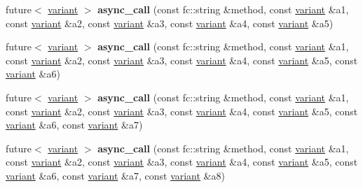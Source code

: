 \begin{Indent}
\begin{DoxyCompactItemize}
future$<$ \mbox{\hyperlink{classfc_1_1variant}{variant}} $>$ {\bfseries async\+\_\+call} (const fc\+::string \&method, const \mbox{\hyperlink{classfc_1_1variant}{variant}} \&a1, const \mbox{\hyperlink{classfc_1_1variant}{variant}} \&a2, const \mbox{\hyperlink{classfc_1_1variant}{variant}} \&a3, const \mbox{\hyperlink{classfc_1_1variant}{variant}} \&a4, const \mbox{\hyperlink{classfc_1_1variant}{variant}} \&a5)
\item 
\mbox{\label{classfc_1_1rpc_1_1json__connection_a9155aabbe97f1f1f95dff448150334d2}} 
future$<$ \mbox{\hyperlink{classfc_1_1variant}{variant}} $>$ {\bfseries async\+\_\+call} (const fc\+::string \&method, const \mbox{\hyperlink{classfc_1_1variant}{variant}} \&a1, const \mbox{\hyperlink{classfc_1_1variant}{variant}} \&a2, const \mbox{\hyperlink{classfc_1_1variant}{variant}} \&a3, const \mbox{\hyperlink{classfc_1_1variant}{variant}} \&a4, const \mbox{\hyperlink{classfc_1_1variant}{variant}} \&a5, const \mbox{\hyperlink{classfc_1_1variant}{variant}} \&a6)
\item 
\mbox{\label{classfc_1_1rpc_1_1json__connection_ab45ee7330f6b2cd3304bc438fce1c40f}} 
future$<$ \mbox{\hyperlink{classfc_1_1variant}{variant}} $>$ {\bfseries async\+\_\+call} (const fc\+::string \&method, const \mbox{\hyperlink{classfc_1_1variant}{variant}} \&a1, const \mbox{\hyperlink{classfc_1_1variant}{variant}} \&a2, const \mbox{\hyperlink{classfc_1_1variant}{variant}} \&a3, const \mbox{\hyperlink{classfc_1_1variant}{variant}} \&a4, const \mbox{\hyperlink{classfc_1_1variant}{variant}} \&a5, const \mbox{\hyperlink{classfc_1_1variant}{variant}} \&a6, const \mbox{\hyperlink{classfc_1_1variant}{variant}} \&a7)
\item 
\mbox{\label{classfc_1_1rpc_1_1json__connection_a456af75a97f0814814cd64bfb13991eb}} 
future$<$ \mbox{\hyperlink{classfc_1_1variant}{variant}} $>$ {\bfseries async\+\_\+call} (const fc\+::string \&method, const \mbox{\hyperlink{classfc_1_1variant}{variant}} \&a1, const \mbox{\hyperlink{classfc_1_1variant}{variant}} \&a2, const \mbox{\hyperlink{classfc_1_1variant}{variant}} \&a3, const \mbox{\hyperlink{classfc_1_1variant}{variant}} \&a4, const \mbox{\hyperlink{classfc_1_1variant}{variant}} \&a5, const \mbox{\hyperlink{classfc_1_1variant}{variant}} \&a6, const \mbox{\hyperlink{classfc_1_1variant}{variant}} \&a7, const \mbox{\hyperlink{classfc_1_1variant}{variant}} \&a8)

\end{DoxyCompactItemize}
\end{Indent}
